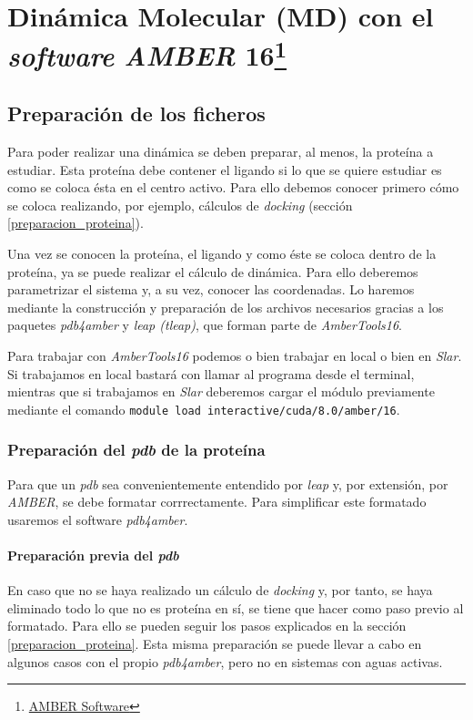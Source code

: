 \chapter[Dinámica Molecular (MD)]{Dinámica Molecular (MD) con el \textit{software} \textit{AMBER} 16\footnote{\href{http://ambermd.org/}{AMBER Software}}}
\newpage



\section{Preparación de los ficheros}
	Para poder realizar una dinámica se deben preparar, al menos, la proteína a estudiar. Esta proteína debe contener el ligando si lo que se quiere estudiar es como se coloca ésta en el centro activo. Para ello debemos conocer primero cómo se coloca realizando, por ejemplo, cálculos de \textit{docking} (sección \ref{preparacion_proteina}). \par
	Una vez se conocen la proteína, el ligando y como éste se coloca dentro de la proteína, ya se puede realizar el cálculo de dinámica. Para ello deberemos parametrizar el sistema y, a su vez, conocer las coordenadas. Lo haremos mediante la construcción y preparación de los archivos necesarios gracias a los paquetes \textit{pdb4amber} y \textit{leap (tleap)}, que forman parte de \textit{AmberTools16}. \par
	Para trabajar con \textit{AmberTools16} podemos o bien trabajar en local o bien en \textit{Slar}. Si trabajamos en local bastará con llamar al programa desde el terminal, mientras que si trabajamos en \textit{Slar} deberemos cargar el módulo previamente mediante el comando \texttt{module load interactive/cuda/8.0/amber/16}.
	
	\subsection{Preparación del \textit{pdb} de la proteína}
		Para que un \textit{pdb} sea convenientemente entendido por \textit{leap} y, por extensión, por \textit{AMBER}, se debe formatar corrrectamente. Para simplificar este formatado usaremos el software \textit{pdb4amber}.
		
		\subsubsection{Preparación previa del \textit{pdb}}
			En caso que no se haya realizado un cálculo de \textit{docking} y, por tanto, se haya eliminado todo lo que no es proteína en sí, se tiene que hacer como paso previo al formatado. Para ello se pueden seguir los pasos explicados en la sección \ref{preparacion_proteina}. Esta misma preparación se puede llevar a cabo en algunos casos con el propio \textit{pdb4amber}, pero no en sistemas con aguas activas.
			

